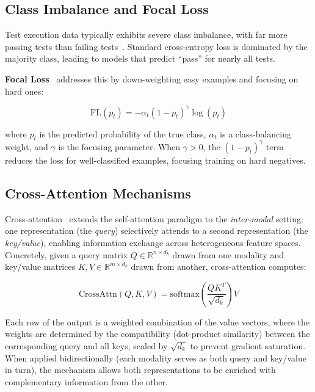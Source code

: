 \documentclass[10pt,journal,compsoc]{IEEEtran}
\begin{document}
\subsection{Class Imbalance and Focal Loss}
\label{sec:bg_focal}

Test execution data typically exhibits severe class imbalance, with far more
passing tests than failing tests~\cite{spieker2017reinforcement, chen2023deeporder}.
Standard cross-entropy loss is dominated by the majority class, leading to models
that predict ``pass'' for nearly all tests.

\textbf{Focal Loss}~\cite{lin2017focal} addresses this by down-weighting easy
examples and focusing on hard ones:

\begin{equation}
    \text{FL}(p_t) = -\alpha_t (1 - p_t)^\gamma \log(p_t)
\end{equation}

where $p_t$ is the predicted probability of the true class, $\alpha_t$ is a
class-balancing weight, and $\gamma$ is the focusing parameter. When $\gamma > 0$,
the $(1 - p_t)^\gamma$ term reduces the loss for well-classified examples,
focusing training on hard negatives.

\subsection{Cross-Attention Mechanisms}
\label{sec:bg_cross_attn}

Cross-attention~\cite{vaswani2017attention} extends the self-attention paradigm
to the \emph{inter-modal} setting: one representation (the \emph{query})
selectively attends to a second representation (the \emph{key/value}),
enabling information exchange across heterogeneous feature spaces. Concretely,
given a query matrix $Q \in \mathbb{R}^{n \times d_k}$ drawn from one modality
and key/value matrices $K, V \in \mathbb{R}^{m \times d_k}$ drawn from another,
cross-attention computes:

\begin{equation}
    \text{CrossAttn}(Q, K, V) = \text{softmax}\left(\frac{QK^T}{\sqrt{d_k}}\right)V
\end{equation}

\noindent
Each row of the output is a weighted combination of the value vectors,
where the weights are determined by the compatibility (dot-product similarity)
between the corresponding query and all keys, scaled by $\sqrt{d_k}$ to
prevent gradient saturation. When applied bidirectionally (each modality
serves as both query and key/value in turn), the mechanism allows both
representations to be enriched with complementary information from the other.
\end{document}
